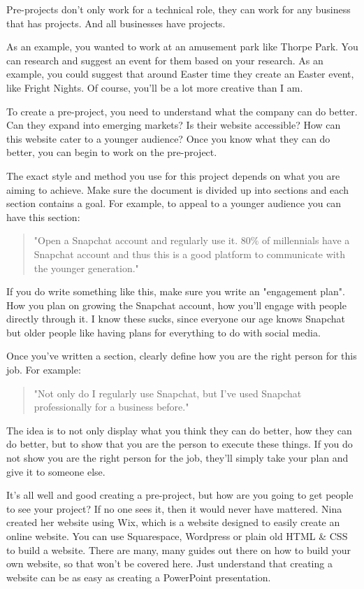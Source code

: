 \documentclass{article}
\begin{document}
Pre-projects don't only work for a technical role, they can work for any
business that has projects. And all businesses have projects.

As an example, you wanted to work at an amusement park like Thorpe Park.
You can research and suggest an event for them based on your research.
As an example, you could suggest that around Easter time they create an
Easter event, like Fright Nights. Of course, you'll be a lot more
creative than I am.

To create a pre-project, you need to understand what the company can do
better. Can they expand into emerging markets? Is their website
accessible? How can this website cater to a younger audience? Once you
know what they can do better, you can begin to work on the pre-project.

The exact style and method you use for this project depends on what you
are aiming to achieve. Make sure the document is divided up into
sections and each section contains a goal. For example, to appeal to a
younger audience you can have this section:
\begin{quote}
    "Open a Snapchat account and regularly use it. 80\% of millennials have
a Snapchat account and thus this is a good platform to communicate with
the younger generation."
\end{quote}
If you do write something like this, make sure you write an "engagement
plan". How you plan on growing the Snapchat account, how you'll engage
with people directly through it. I know these sucks, since everyone our
age knows Snapchat but older people like having plans for everything to
do with social media.

Once you've written a section, clearly define how you are the right
person for this job. For example:
\begin{quote}
    "Not only do I regularly use Snapchat, but I've used Snapchat
professionally for a business before."
\end{quote}
The idea is to not only display what you think they can do better, how
they can do better, but to show that you are the person to execute these
things. If you do not show you are the right person for the job, they'll
simply take your plan and give it to someone else.

It's all well and good creating a pre-project, but how are you going to
get people to see your project? If no one sees it, then it would never
have mattered. Nina created her website using Wix, which is a website
designed to easily create an online website. You can use Squarespace,
Wordpress or plain old HTML \& CSS to build a website. There are many,
many guides out there on how to build your own website, so that won't be
covered here. Just understand that creating a website can be as easy as
creating a PowerPoint presentation.
\end{document}
